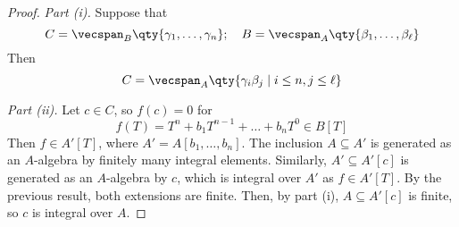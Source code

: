 \begin{proof}
    \emph{Part (i).}
    Suppose that
    \[ C = \vecspan_B\qty{\gamma_1, \dots, \gamma_n};\quad B = \vecspan_A\qty{\beta_1, \dots, \beta_\ell} \]
    Then
    \[ C = \vecspan_A\qty{\gamma_i \beta_j \mid i \leq n, j \leq \ell} \]

    \emph{Part (ii).}
    Let \( c \in C \), so \( f(c) = 0 \) for
    \[ f(T) = T^n + b_1 T^{n-1} + \dots + b_n T^0 \in B[T] \]
    Then \( f \in A'[T] \), where \( A' = A[b_1, \dots, b_n] \).
    The inclusion \( A \subseteq A' \) is generated as an \( A \)-algebra by finitely many integral elements.
    Similarly, \( A' \subseteq A'[c] \) is generated as an \( A \)-algebra by \( c \), which is integral over \( A' \) as \( f \in A'[T] \).
    By the previous result, both extensions are finite.
    Then, by part (i), \( A \subseteq A'[c] \) is finite, so \( c \) is integral over \( A \).
\end{proof}

